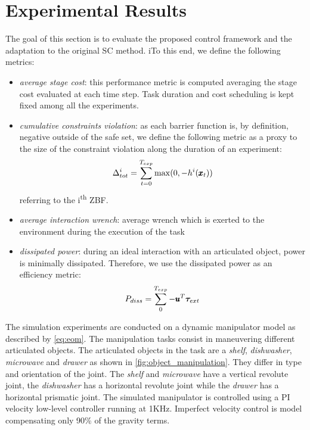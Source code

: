 \section{Experimental Results} \label{sec:experiments}

The goal of this section is to evaluate the proposed control framework and the adaptation to the original SC method. iTo this end, we define the following metrics:
\begin{itemize}
    \item \textit{average stage cost}: this performance metric is computed averaging the stage cost evaluated at each time step. Task duration and cost scheduling is kept fixed among all the experiments.  
    \item \textit{cumulative constraints violation}: as each barrier function is, by definition, negative outside of the safe set, we define the following metric as a proxy to the size of the constraint violation along the duration of an experiment:
    \begin{equation*}
        \Delta^{i}_{tot} = \sum\limits_{t=0}^{T_{exp}} \max(0, -h^i(\pmb{x}_t))
    \end{equation*}
    referring to the i\textsuperscript{th} ZBF.
    \item \textit{average interaction wrench}: average wrench which is exerted to the environment during the execution of the task
    \item \textit{dissipated power}: during an ideal interaction with an articulated object, power is minimally dissipated. Therefore, we use the dissipated power as an efficiency metric:
    \begin{equation}
        P_{diss} = \sum\limits_{0}^{T_{exp}} -\pmb{u}^T \boldsymbol{\tau}_{ext}
    \end{equation}
\end{itemize}
The simulation experiments are conducted on a dynamic manipulator model as described by \eqref{eq:eom}. The manipulation tasks consist in maneuvering different articulated objects. The articulated objects in the task are a \textit{shelf}, \textit{dishwasher}, \textit{microwave} and \textit{drawer} as shown in \fig\ref{fig:object_manipulation}. They differ in type and orientation of the joint. The \textit{shelf} and \textit{microwave} have a vertical revolute joint,  the \textit{dishwasher} has a horizontal revolute joint while the \textit{drawer} has a horizontal prismatic joint. The simulated manipulator is controlled using a PI velocity low-level controller running at 1KHz. Imperfect velocity control is model compensating only 90\% of the gravity terms.
  
